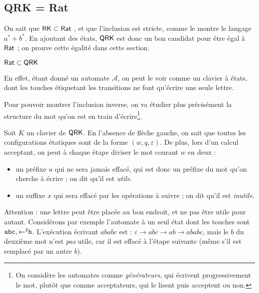 \documentclass[12pt, a4paper]{article}
\newcommand{\A}{\mathcal{A}}
\begin{document}
    \subsection{QRK = Rat}\label{sectionclavetats}
    On sait que $\mathsf{RK} \subset \mathsf{Rat}$ \autocite[théorèmes~101/102]{bible}, et que l'inclusion est stricte, comme le montre le langage $a^* + b^*$. En ajoutant des états,
    $\mathsf{QRK}$ est donc un bon candidat pour être égal à $\mathsf{Rat}$ ; on prouve cette égalité dans cette section.
    
    \begin{RatdansQRK}
        $\mathsf{Rat} \subset \mathsf{QRK}$
    \end{RatdansQRK}
    En effet, étant donné un automate $\A$, on peut le voir comme un clavier à états, dont les touches étiquetant les transitions 
    ne font qu'écrire une seule lettre.
    


    Pour pouvoir montrer l'inclusion inverse, on va étudier plus précisément la structure du mot qu'on est en train d'écrire\footnote{On considère les automates comme \emph{générateurs}, qui écrivent progressivement le mot, plutôt que comme acceptateurs, qui le lisent puis acceptent ou non.}.
    
    Soit $K$ un clavier de $\mathsf{QRK}$. En l'absence de flèche gauche, on sait que toutes les configurations étatiques sont de la forme $(w,q,\varepsilon)$. De plus, lors d'un calcul acceptant, on peut à chaque étape diviser le mot courant $w$ en deux :
    \begin{itemize}
        \item un préfixe $u$ qui ne sera jamais effacé, qui est donc un préfixe du mot qu'on cherche à écrire ; on dit qu'il est \emph{utile}.
        \item un suffixe $x$ qui sera effacé par les opérations à suivre ; on dit qu'il est \emph{inutile}.
    \end{itemize}
    \begin{example}[Remarque]
        Attention : une lettre peut être placée au bon endroit, et ne pas être utile pour autant. Considérons par exemple l'automate à un seul état dont les touches sont $\mathtt{abc},\mathtt{\mathord{\leftarrow}^2b}$. 
    L'exécution écrivant $ababc$ est : $\varepsilon \rightarrow abc \rightarrow ab \rightarrow ababc$, mais le $b$ du deuxième mot n'est \emph{pas} utile, car il est effacé à l'étape suivante (même s'il est remplacé par un autre $b$). \smallskip
    \end{example}
    
\end{document}
